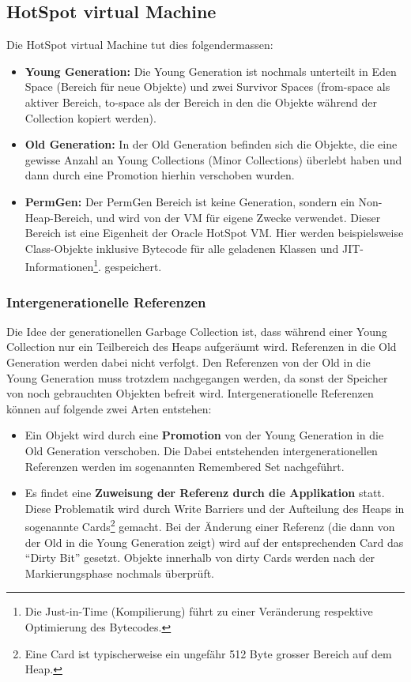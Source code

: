 \subsection{HotSpot virtual Machine}
Die HotSpot virtual Machine tut dies folgendermassen\cite{langerkreft201003}:

\begin{itemize}
	\item \textbf{Young Generation:} Die Young Generation ist nochmals unterteilt in Eden Space (Bereich für neue Objekte) und zwei Survivor Spaces (from-space als aktiver Bereich, to-space als der Bereich in den die Objekte während der Collection kopiert werden).
	\item \textbf{Old Generation:} In der Old Generation befinden sich die Objekte, die eine gewisse Anzahl an Young Collections (Minor Collections) überlebt haben und dann durch eine Promotion hierhin verschoben wurden.
	\item  \textbf{PermGen:} Der PermGen Bereich ist keine Generation, sondern ein Non-Heap-Bereich, und wird von der VM für eigene Zwecke verwendet. Dieser Bereich ist eine Eigenheit der Oracle HotSpot VM. Hier werden beispielsweise Class-Objekte inklusive Bytecode für alle geladenen Klassen und JIT-Informationen\footnote{Die Just-in-Time (Kompilierung) führt zu einer Veränderung respektive Optimierung des Bytecodes.}. gespeichert.
\end{itemize}

\subsubsection{Intergenerationelle Referenzen}
Die Idee der generationellen Garbage Collection ist, dass während einer Young Collection nur ein Teilbereich des Heaps aufgeräumt wird. Referenzen in die Old Generation werden dabei nicht verfolgt. Den Referenzen von der Old in die Young Generation muss trotzdem nachgegangen werden, da sonst der Speicher von noch gebrauchten Objekten befreit wird. Intergenerationelle Referenzen können auf folgende zwei Arten entstehen:
\begin{itemize}
	\item Ein Objekt wird durch eine  \textbf{Promotion} von der Young Generation in die Old Generation verschoben. Die Dabei entstehenden intergenerationellen Referenzen werden im sogenannten Remembered Set nachgeführt. 
	\item Es findet eine \textbf{Zuweisung der Referenz durch die Applikation} statt. Diese Problematik wird durch Write Barriers und der Aufteilung des Heaps in sogenannte Cards\footnote{Eine Card ist typischerweise ein ungefähr 512 Byte grosser Bereich auf dem Heap.} gemacht. Bei der Änderung einer Referenz (die dann von der Old in die Young Generation zeigt) wird auf der entsprechenden Card das ``Dirty Bit'' gesetzt. Objekte innerhalb von dirty Cards werden nach der Markierungsphase nochmals überprüft.
\end{itemize}

